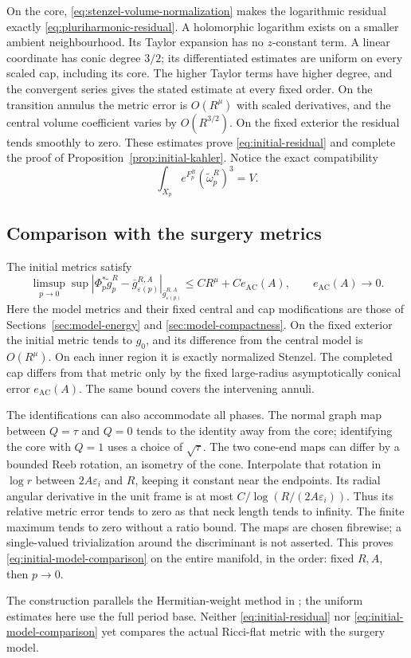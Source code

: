 On the core, \eqref{eq:stenzel-volume-normalization} makes
the logarithmic residual exactly
\eqref{eq:pluriharmonic-residual}. A holomorphic logarithm
exists on a smaller ambient neighbourhood. Its Taylor
expansion has no $z$-constant term. A linear coordinate
has conic degree $3/2$; its differentiated estimates are
uniform on every scaled cap, including its core. The
higher Taylor terms have higher degree, and the convergent
series gives the stated estimate at every fixed order.
On the transition annulus the metric error is $O(R^\mu)$
with scaled derivatives, and the central volume coefficient
varies by $O(R^{3/2})$. On the fixed exterior the residual
tends smoothly to zero. These estimates prove
\eqref{eq:initial-residual} and complete the proof of
Proposition~\ref{prop:initial-kahler}. Notice the exact
compatibility
\begin{equation}\label{eq:initial-volume-compatibility}
 \int_{X_p}e^{F_p^R}(\widetilde\omega_p^R)^3=V.
\end{equation}

\subsection{Comparison with the surgery metrics}

The initial metrics satisfy
\begin{equation}\label{eq:initial-model-comparison}
 \limsup_{p\to0}\sup
 |\Phi_p^*\widetilde g_p^R-
       \bar g_{\varepsilon(p)}^{R,A}|
                  _{\bar g_{\varepsilon(p)}^{R,A}}
 \le C R^\mu+C e_{\mathrm{AC}}(A),
 \qquad e_{\mathrm{AC}}(A)\longrightarrow0.
\end{equation}
Here the model metrics and their fixed central and cap
modifications are those of Sections~\ref{sec:model-energy}
and \ref{sec:model-compactness}. On the fixed exterior
the initial metric tends to $g_0$, and its difference
from the central model is $O(R^\mu)$. On each inner region
it is exactly normalized Stenzel. The completed cap differs
from that metric only by the fixed large-radius
asymptotically conical error $e_{\mathrm{AC}}(A)$.
The same bound covers the intervening annuli.

The identifications can also accommodate all phases.
The normal graph map between $Q=\tau$ and $Q=0$ tends
to the identity away from the core; identifying the core
with $Q=1$ uses a choice of $\sqrt{\tau}$. The two cone-end
maps can differ by a bounded Reeb rotation, an isometry
of the cone. Interpolate that rotation in $\log r$
between $2A\varepsilon_i$ and $R$, keeping it constant
near the endpoints. Its radial angular derivative in
the unit frame is at most
$C/\log(R/(2A\varepsilon_i))$. Thus its relative metric
error tends to zero as that neck length tends to infinity.
The finite maximum tends to zero without a ratio bound.
The maps are chosen fibrewise; a single-valued
trivialization around the discriminant is not asserted.
This proves \eqref{eq:initial-model-comparison} on the
entire manifold, in the order: fixed $R,A$, then $p\to0$.

The construction parallels the Hermitian-weight method in
\cite[Proposition~5.9]{benabida}; the uniform estimates here
use the full period base. Neither
\eqref{eq:initial-residual} nor
\eqref{eq:initial-model-comparison} yet compares the
actual Ricci-flat metric with the surgery model.
